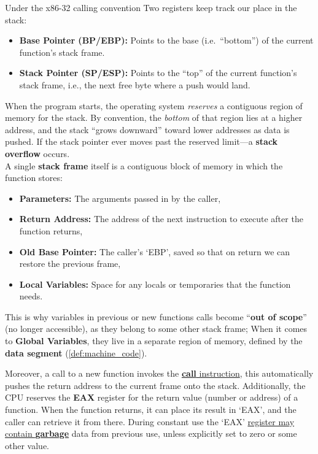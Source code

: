 \begin{Def}

Under the x86-32 calling convention Two registers keep track our place in the stack:
\begin{itemize}
  \item \textbf{Base Pointer (BP/EBP):} Points to the base (i.e.\ ``bottom'') of the current function's stack frame.
  \item \textbf{Stack Pointer (SP/ESP):} Points to the ``top'' of the current function's stack frame, i.e., the next free byte where a push would land.
\end{itemize}

\noindent
When the program starts, the operating system \emph{reserves} a contiguous region of memory for the stack. By convention, the \emph{bottom} of that region lies at a higher address, 
and the stack ``grows downward'' toward lower addresses as data is pushed. If the stack pointer ever moves past the reserved limit---a \textbf{stack overflow} occurs.
\\

\noindent
A single \textbf{stack frame} itself is a contiguous block of memory in which the function stores:
\begin{itemize}
  \item \textbf{Parameters:} The arguments passed in by the caller,  
  \item \textbf{Return Address:} The address of the next instruction to execute after the function returns,
  \item \textbf{Old Base Pointer:} The caller's `EBP', saved so that on return we can restore the previous frame,
  \item \textbf{Local Variables:} Space for any locals or temporaries that the function needs.  
\end{itemize}

\noindent
This is why variables in previous or new functions calls become ``\textbf{out of scope}'' (no longer accessible), as they belong to some other stack frame; 
When it comes to \textbf{Global Variables}, they live in a separate region of memory, defined by the \textbf{data segment} (\ref{def:machine_code}).

Moreover, a call to a new function invokes the \underline{\textbf{call} instruction}, this automatically pushes the return address to the current frame onto the stack.
Additionally, the CPU reserves the \textbf{EAX} register for the return value (number or address) of a function. 
When the function returns, it can place its result in `EAX', and the caller can retrieve it from there. During constant use 
the `EAX' \underline{register may contain \textbf{garbage}} data from previous use, unless explicitly set to zero or some other value.
\end{Def}

